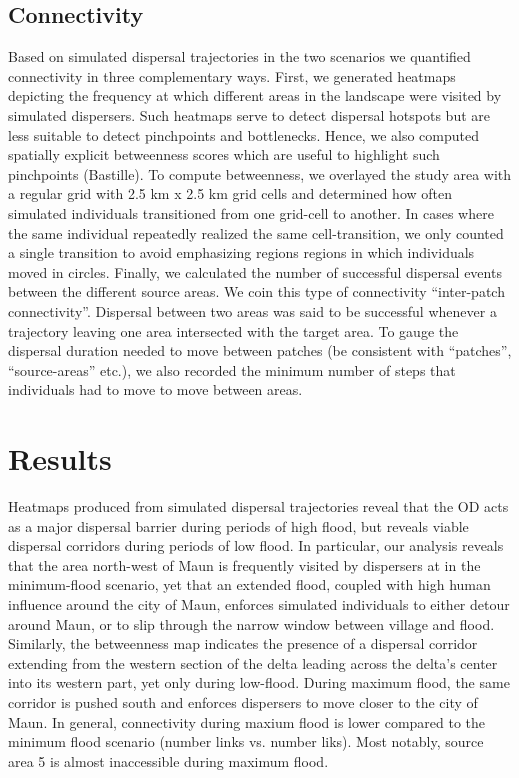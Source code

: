 \documentclass[abstract=on,10pt,a4paper,bibliography=totocnumbered]{article}
\begin{document}
\subsection{Connectivity}
Based on simulated dispersal trajectories in the two scenarios we quantified
connectivity in three complementary ways. First, we generated heatmaps depicting
the frequency at which different areas in the landscape were visited by
simulated dispersers. Such heatmaps serve to detect dispersal hotspots but are
less suitable to detect pinchpoints and bottlenecks. Hence, we also computed
spatially explicit betweenness scores which are useful to highlight such
pinchpoints (Bastille). To compute betweenness, we overlayed the study area with
a regular grid with 2.5 km x 2.5 km grid cells and determined how often
simulated individuals transitioned from one grid-cell to another. In cases where
the same individual repeatedly realized the same cell-transition, we only
counted a single transition to avoid emphasizing regions regions in which
individuals moved in circles. Finally, we calculated the number of successful
dispersal events between the different source areas. We coin this type of
connectivity ``inter-patch connectivity''. Dispersal between two areas was said
to be successful whenever a trajectory leaving one area intersected with the
target area. To gauge the dispersal duration needed to move between patches (be
consistent with ``patches'', ``source-areas'' etc.), we also recorded the
minimum number of steps that individuals had to move to move between areas.

\section{Results}
Heatmaps produced from simulated dispersal trajectories reveal that the OD acts
as a major dispersal barrier during periods of high flood, but reveals viable
dispersal corridors during periods of low flood. In particular, our analysis
reveals that the area north-west of Maun is frequently visited by dispersers at
in the minimum-flood scenario, yet that an extended flood, coupled with high
human influence around the city of Maun, enforces simulated individuals to
either detour around Maun, or to slip through the narrow window between village
and flood. Similarly, the betweenness map indicates the presence of a dispersal
corridor extending from the western section of the delta leading across the
delta's center into its western part, yet only during low-flood. During maximum
flood, the same corridor is pushed south and enforces dispersers to move closer
to the city of Maun. In general, connectivity during maxium flood is lower
compared to the minimum flood scenario (number links vs. number liks). Most
notably, source area 5 is almost inaccessible during maximum flood.
\end{document}
